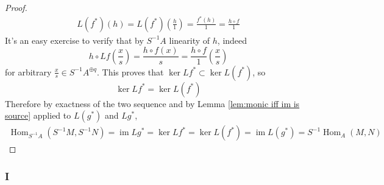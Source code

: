 \documentclass{article}
\DeclareMathOperator{\im}{\mathrm{im}}
\DeclareMathOperator{\Hom}{\mathrm{Hom}}
\begin{document}
\begin{proof}
\begin{align*}
        L(f^*)(h)=L(f^*)(\frac{h}{1})=\frac{f^*(h)}{1}=\frac{h\circ f}{1}
    \end{align*}
    It's an easy exercise to verify that by $S^{-1}A$ linearity of $h$, indeed 
    \[
    h\circ Lf(\frac{x}{s})=\frac{h\circ f(x)}{s}=\frac{h\circ f}{1}(\frac{x}{s})
    \]
    for arbitrary $\frac{x}{s}\in S^{-1}A^{\oplus q}$. This proves that $\ker Lf^*\subset \ker L(f^*)$, so
    \[
    \ker Lf^*=\ker L(f^*)
    \]
    Therefore by exactness of the two sequence and by Lemma \ref{lem:monic iff im is source} applied to $L(g^*)$ and $Lg^*$,
    \begin{align*}
        \Hom_{S^{-1}A}(S^{-1}M,S^{-1}N)=\im Lg^*=\ker Lf^*=\ker L(f^*)=\im L(g^*)=S^{-1}\Hom_A(M,N)
    \end{align*}
\end{proof}
\subsubsection{I}\label{1.6.I}
\end{document}
